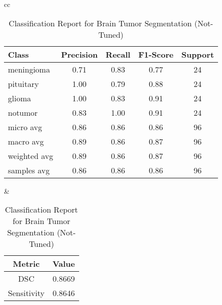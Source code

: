   \begin{table}[ht]
  \centering
  \begin{tabular}{cc}
      \begin{minipage}{.6\linewidth}
          \centering
          \begin{subtable}[t]{\linewidth}
              \centering
              \begin{tabular}{|l|c|c|c|c|}
                  \hline 
                  \textbf{Class} & \textbf{Precision} & \textbf{Recall} & \textbf{F1-Score} & \textbf{Support} \\ 
                  \hline 
                  meningioma & 0.71 & 0.83 & 0.77 & 24 \\ 
                  \hline
                  pituitary  & 1.00 & 0.79 & 0.88 & 24 \\ 
                  \hline
                  glioma     & 1.00 & 0.83 & 0.91 & 24 \\ 
                  \hline
                  notumor    & 0.83 & 1.00 & 0.91 & 24 \\ 
                  \hline
                  micro avg  & 0.86 & 0.86 & 0.86 & 96 \\ 
                  \hline
                  macro avg  & 0.89 & 0.86 & 0.87 & 96 \\ 
                  \hline
                  weighted avg & 0.89 & 0.86 & 0.87 & 96 \\ 
                  \hline
                  samples avg & 0.86 & 0.86 & 0.86 & 96 \\ 
                  \hline
              \end{tabular}
              \caption{Classification Report for Brain Tumor Segmentation (Not-Tuned)} 
              \label{tab:xception_nt_classification_report}
          \end{subtable}
      \end{minipage} &
      \begin{minipage}{.35\linewidth}
          \centering
          \begin{subtable}[t]{\linewidth}
              \centering
              \begin{tabular}{|c|c|}
                  \hline 
                  \textbf{Metric} & \textbf{Value} \\ 
                  \hline
                  DSC & 0.8669 \\ 
                  \hline
                  Sensitivity & 0.8646 \\ 
                  \hline

\end{tabular}
\end{subtable}
\end{minipage}
\end{tabular}
\end{table}
